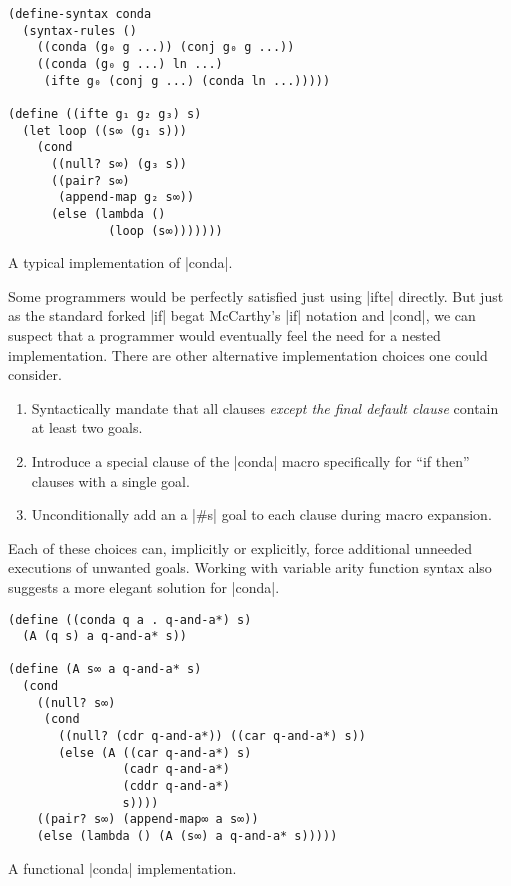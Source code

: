 \documentclass[sigplan,screen,draft,anonymous,review,natbib=false]{acmart}
\begin{document}
\begin{listing}
  \begin{verbatim}
(define-syntax conda
  (syntax-rules ()
    ((conda (g₀ g ...)) (conj g₀ g ...))
    ((conda (g₀ g ...) ln ...)
     (ifte g₀ (conj g ...) (conda ln ...)))))

(define ((ifte g₁ g₂ g₃) s)
  (let loop ((s∞ (g₁ s)))
    (cond
      ((null? s∞) (g₃ s))
      ((pair? s∞)
       (append-map g₂ s∞))
      (else (lambda ()
              (loop (s∞)))))))
  \end{verbatim}
  \caption{A typical implementation of \rackinline|conda|.}
  \label{mnt:conda-implementation}
\end{listing}

Some programmers would be perfectly satisfied just using
\rackinline|ifte| directly. But just as the standard forked
\rackinline|if| begat McCarthy's \rackinline|if| notation and
\rackinline|cond|, we can suspect that a programmer would eventually
feel the need for a nested implementation. There are other alternative
implementation choices one could consider.

\begin{enumerate}

\item Syntactically mandate that all clauses \emph{except the final
    default clause} contain at least two goals.

\item Introduce a special clause of the \rackinline|conda| macro
  specifically for \enquote{if then} clauses with a single goal.

\item Unconditionally add an a \rackinline|#s| goal to each clause
  during macro expansion.

\end{enumerate}

Each of these choices can, implicitly or explicitly, force additional
unneeded executions of unwanted goals. Working with variable arity
function syntax also suggests a more elegant solution for
\rackinline|conda|.

\begin{listing}
  \begin{verbatim}
(define ((conda q a . q-and-a*) s)
  (A (q s) a q-and-a* s))

(define (A s∞ a q-and-a* s)
  (cond
    ((null? s∞)
     (cond
       ((null? (cdr q-and-a*)) ((car q-and-a*) s))
       (else (A ((car q-and-a*) s)
                (cadr q-and-a*)
                (cddr q-and-a*)
                s))))
    ((pair? s∞) (append-map∞ a s∞))
    (else (lambda () (A (s∞) a q-and-a* s)))))
  \end{verbatim}
  \caption{A functional \rackinline|conda| implementation.}
  \label{mnt:conda-good-re-implementation}
\end{listing}
\end{document}
